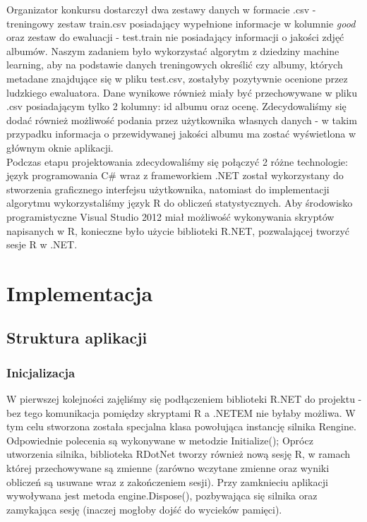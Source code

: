 \documentclass[a4paper,twoside]{article}
\begin{document}
Organizator konkursu dostarczył dwa zestawy danych w formacie .csv - treningowy zestaw train.csv posiadający wypełnione informacje w kolumnie \textit{good} oraz zestaw do ewaluacji - test.train nie posiadający informacji o jakości zdjęć albumów.
Naszym zadaniem było wykorzystać algorytm z dziedziny machine learning, aby na podstawie danych treningowych określić czy albumy, których metadane znajdujące się w pliku test.csv, zostałyby pozytywnie ocenione przez ludzkiego ewaluatora. Dane wynikowe również miały być przechowywane w pliku .csv posiadającym tylko 2 kolumny: id albumu oraz ocenę. Zdecydowaliśmy się dodać również możliwość podania przez użytkownika własnych danych - w takim przypadku informacja o przewidywanej jakości albumu ma zostać wyświetlona w głównym oknie aplikacji. \\

Podczas etapu projektowania zdecydowaliśmy się połączyć 2 różne technologie: język programowania C\# wraz z frameworkiem .NET został wykorzystany do stworzenia graficznego interfejsu użytkownika, natomiast do implementacji algorytmu wykorzystaliśmy język R do obliczeń statystycznych. Aby środowisko programistyczne Visual Studio 2012 miał możliwość wykonywania skryptów napisanych w R, konieczne było użycie biblioteki R.NET, pozwalającej tworzyć sesje R w .NET.

\section{Implementacja}

\subsection{Struktura aplikacji}

\subsubsection{Inicjalizacja}

W pierwszej kolejności zajęliśmy się podłączeniem biblioteki R.NET do projektu - bez tego komunikacja pomiędzy skryptami R a .NETEM nie byłaby możliwa. W tym celu stworzona została specjalna klasa powołująca instancję silnika Rengine. Odpowiednie polecenia są wykonywane w metodzie Initialize(); Oprócz utworzenia silnika, biblioteka RDotNet tworzy również nową sesję R, w ramach której przechowywane są zmienne (zarówno wczytane zmienne oraz wyniki obliczeń są usuwane wraz z zakończeniem sesji). Przy zamknieciu aplikacji wywoływana jest metoda engine.Dispose(), pozbywająca się silnika oraz zamykająca sesję (inaczej mogłoby dojść do wycieków pamięci). \\
\end{document}
